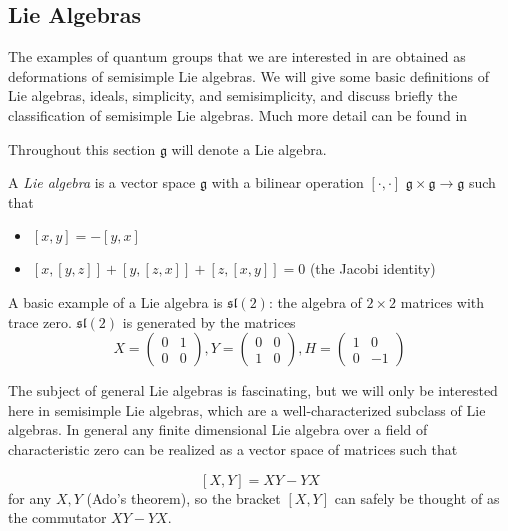 \documentclass[]{article}
\newcommand{\sll}{\mathfrak{sl}}
\numberwithin{equation}{subsection}
\begin{document}
\subsection{Lie Algebras}

The examples of quantum groups that we are interested in are obtained as
deformations of semisimple Lie algebras. We will give some basic definitions of
Lie algebras, ideals, simplicity, and semisimplicity, and discuss briefly the
classification of semisimple Lie algebras. Much more detail can be found in
\cite{Humphreys1973}

Throughout this section $\mathfrak{g}$ will denote a Lie algebra.

A \emph{Lie algebra} is a vector space $\mathfrak{g}$ with a bilinear operation $\left[ \cdot, \cdot \right]$  $\mathfrak{g} \times \mathfrak{g} \to \mathfrak{g}$ such that 

\begin{itemize}
    \item $\left[ x,y \right] = -\left[ y,x \right]$
    \item $\left[ x, \left[ y,z \right] \right] + \left[ y, \left[ z,x \right] \right] + \left[ z, \left[ x,y \right] \right] = 0$ (the Jacobi identity)
\end{itemize}

A basic example of a Lie algebra is $\sll(2)$: the algebra of $2 \times 2$ matrices with trace zero. $\sll(2)$ is generated by the matrices 
\begin{equation}
    X = \begin{pmatrix} 0 & 1 \\ 0 & 0 \end{pmatrix},
    Y = \begin{pmatrix} 0 & 0 \\ 1 & 0 \end{pmatrix}, 
    H = \begin{pmatrix} 1 & 0 \\ 0 &-1 \end{pmatrix}
\end{equation}

The subject of general Lie algebras is fascinating, but we will only be
interested here in semisimple Lie algebras, which are a well-characterized
subclass of Lie algebras. In general any finite dimensional Lie algebra over a
field of characteristic zero can be realized as a vector space of matrices such
that 

\[ \left[ X,Y \right] = XY - YX\] 
for any $X,Y$ (Ado's theorem), so the bracket $[X,Y]$ can safely be thought of as the commutator $XY - YX$. 
\end{document}
